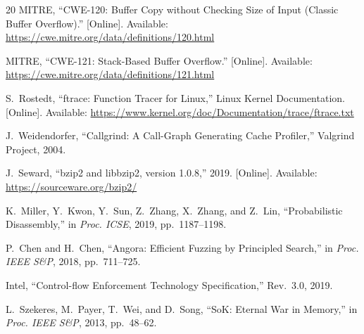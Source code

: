 \documentclass[10pt,a4paper]{article}
\begin{document}
\begin{thebibliography}{20}
MITRE, ``CWE-120: Buffer Copy without Checking Size of Input (Classic
Buffer Overflow).'' [Online]. Available:
\url{https://cwe.mitre.org/data/definitions/120.html}

MITRE, ``CWE-121: Stack-Based Buffer Overflow.'' [Online]. Available:
\url{https://cwe.mitre.org/data/definitions/121.html}

S.~Rostedt, ``ftrace: Function Tracer for Linux,'' Linux Kernel
Documentation. [Online]. Available:
\url{https://www.kernel.org/doc/Documentation/trace/ftrace.txt}

J.~Weidendorfer, ``Callgrind: A Call-Graph Generating Cache Profiler,''
Valgrind Project, 2004.

J.~Seward, ``bzip2 and libbzip2, version 1.0.8,'' 2019. [Online].
Available: \url{https://sourceware.org/bzip2/}

K.~Miller, Y.~Kwon, Y.~Sun, Z.~Zhang, X.~Zhang, and Z.~Lin,
``Probabilistic Disassembly,'' in \emph{Proc. ICSE}, 2019, pp.~1187--1198.

P.~Chen and H.~Chen, ``Angora: Efficient Fuzzing by Principled Search,''
in \emph{Proc. IEEE S\&P}, 2018, pp.~711--725.

Intel, ``Control-flow Enforcement Technology Specification,'' Rev.~3.0,
2019.

L.~Szekeres, M.~Payer, T.~Wei, and D.~Song, ``SoK: Eternal War in
Memory,'' in \emph{Proc. IEEE S\&P}, 2013, pp.~48--62.

\end{thebibliography}
\end{document}

